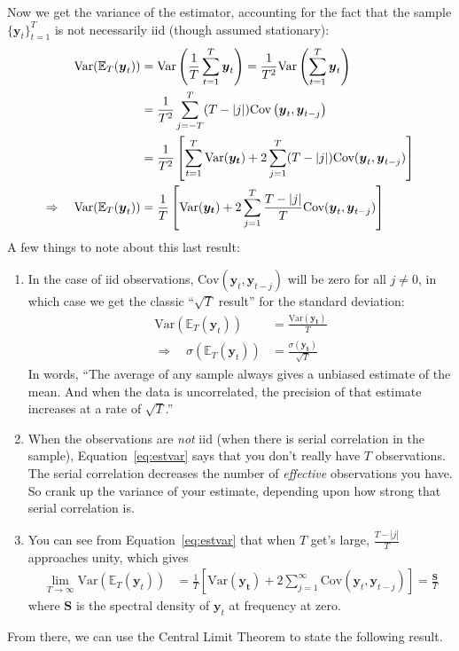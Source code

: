 \documentclass[12pt]{article}
\theoremstyle{plain}
\theoremstyle{definition}
\theoremstyle{remark}
\newcommand{\bsS}{\boldsymbol{S}}
\newcommand{\bsy}{\boldsymbol{y}}
\begin{document}
Now we get the variance of the estimator, accounting for the fact that
the sample $\{\bsy_t\}_{t=1}^T$ is not necessarily iid (though
assumed stationary):
\begin{align}
  \text{Var}(\mathbb{E}_T(\bsy_t))
  &=
  \text{Var}\left(
  \frac{1}{T}\sum^T_{t=1} \bsy_t
  \right)
  =
  \frac{1}{T^2}\text{Var}\left(
  \sum^T_{t=1} \bsy_t
  \right)\notag\\
  &=
  \frac{1}{T^2}
  \sum^T_{j=-T} (T-|j|)\text{Cov}\left(
    \bsy_t, \bsy_{t-j}
  \right) \notag\\
  &=
  \frac{1}{T^2}
  \left[
    \sum^T_{t=1} \text{Var}(\boldsymbol{y_t})
    +
    2\sum^T_{j=1} (T-|j|)\text{Cov}(\bsy_t,\bsy_{t-j})
  \right]\notag\\
  \Rightarrow\quad
  \text{Var}(\mathbb{E}_T(\bsy_t))
  &=
  \frac{1}{T}
  \left[
    \text{Var}(\boldsymbol{y_t})
    +
    2\sum^T_{j=1} \frac{T-|j|}{T}
    \text{Cov}(\bsy_t,\bsy_{t-j})
  \right]
  \label{eq:estvar}
\end{align}
A few things to note about this last result:
\begin{enumerate}
  \item In the case of iid observations,
    $\text{Cov}(\bsy_t,\bsy_{t-j})$ will be zero for
    all $j\neq 0$, in which case we get the classic ``$\sqrt{T}$
    result'' for the standard deviation:
    \begin{align*}
      \text{Var}(\mathbb{E}_T(\bsy_t))
      &=
      \frac{\text{Var}(\boldsymbol{y_t})}{T}\\
      \Rightarrow\quad
      \sigma(\mathbb{E}_T(\bsy_t))
      &=
      \frac{\sigma(\boldsymbol{y_t})}{\sqrt{T}}
    \end{align*}
    In words, ``The average of any sample always gives a unbiased
    estimate of the mean. And when the data is uncorrelated, the
    precision of that estimate increases at a rate of $\sqrt{T}$.''

  \item When the observations are \emph{not} iid (when there is serial
    correlation in the sample), Equation~\ref{eq:estvar} says that you
    don't really have $T$ observations. The serial correlation decreases
    the number of \emph{effective} observations you have. So crank up
    the variance of your estimate, depending upon how strong that serial
    correlation is.

  \item
    You can see from Equation~\ref{eq:estvar} that when $T$ get's large,
    $\frac{T-|j|}{T}$ approaches unity, which gives
    \begin{align*}
      \lim_{T\rightarrow\infty}
      \text{Var}(\mathbb{E}_T(\bsy_t))
      &=
      \frac{1}{T}
      \left[
        \text{Var}(\boldsymbol{y_t})
        +
        2\sum^\infty_{j=1}
        \text{Cov}(\bsy_t,\bsy_{t-j})
      \right]
      =
      \frac{\bsS}{T}
    \end{align*}
    where $\bsS$ is the spectral density of $\bsy_t$
    at frequency at zero.
\end{enumerate}
From there, we can use the Central Limit Theorem to state the following
result.
\end{document}
